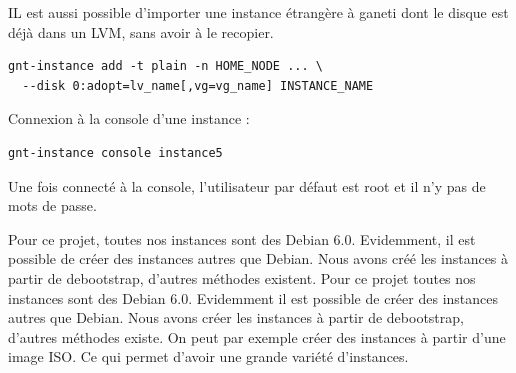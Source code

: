 IL est aussi possible d'importer une instance étrangère à ganeti dont le disque est déjà dans un LVM, sans avoir à le recopier.

\begin{lstlisting}
gnt-instance add -t plain -n HOME_NODE ... \
  --disk 0:adopt=lv_name[,vg=vg_name] INSTANCE_NAME
\end{lstlisting}

Connexion à la console d'une instance :
\begin{lstlisting}
gnt-instance console instance5
\end{lstlisting}
Une fois connecté à la console, l'utilisateur par défaut est root et il n'y pas de mots de passe.

Pour ce projet, toutes nos instances sont des Debian 6.0.
Evidemment, il est possible de créer des instances autres que Debian. Nous avons créé les instances à partir de debootstrap, d'autres méthodes existent.
Pour ce projet toutes nos instances sont des Debian 6.0.
Evidemment il est possible de créer des instances autres que Debian. Nous avons créer les instances à partir de debootstrap, d'autres méthodes existe.
On peut par exemple créer des instances à partir d'une image ISO. Ce qui permet d'avoir une grande variété d'instances.

